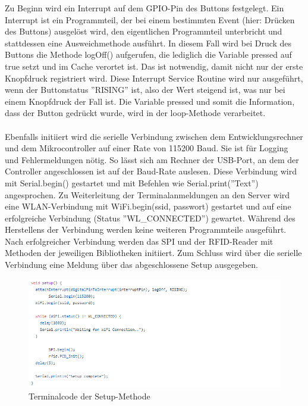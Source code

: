 \documentclass[12pt,titlepage]{scrartcl}
\begin{document}
		\noindent Zu Beginn wird ein Interrupt auf dem GPIO-Pin des Buttons festgelegt. Ein Interrupt ist ein Programmteil, der bei einem bestimmten Event (hier: Drücken des Buttons) ausgelöst wird, den eigentlichen Programmteil unterbricht und stattdessen eine Ausweichmethode ausführt. In diesem Fall wird bei Druck des Buttons die Methode logOff() aufgerufen, die lediglich die Variable pressed auf true setzt und im Cache verortet ist. Das ist notwendig, damit nicht nur der erste Knopfdruck registriert wird. Diese Interrupt Service Routine wird nur ausgeführt, wenn der Buttonstatus ''RISING'' ist, also der Wert steigend ist, was nur bei einem Knopfdruck der Fall ist. Die Variable pressed und somit die Information, dass der Button gedrückt wurde, wird in der loop-Methode verarbeitet. \\ \\
		Ebenfalls initiiert wird die serielle Verbindung zwischen dem Entwicklungsrechner und dem Mikrocontroller auf einer Rate von 115200 Baud. Sie ist für Logging und Fehlermeldungen nötig. So lässt sich am Rechner der USB-Port, an dem der Controller angeschlossen ist auf der Baud-Rate auslesen. Diese Verbindung wird mit Serial.begin() gestartet und mit Befehlen wie Serial.print(''Text'') angesprochen. Zu Weiterleitung der Terminalanmeldungen an den Server wird eine WLAN-Verbindung mit WiFi.begin(ssid, passwort) gestartet und auf eine erfolgreiche Verbindung (Status ''WL\_CONNECTED'') gewartet. Während des Herstellens der Verbindung werden keine weiteren Programmteile ausgeführt. Nach erfolgreicher Verbindung werden das SPI und der RFID-Reader mit Methoden der jeweiligen Bibliotheken initiiert. Zum Schluss wird über die serielle Verbindung eine Meldung über das abgeschlossene Setup ausgegeben. \\
			\begin{figure}[H] 
  			\centering
    		\includegraphics[height=0.3\textheight]{terminalSetup}
  			\caption{Terminalcode der Setup-Methode}
  			\label{fig:terminalSetup}
		\end{figure}
\end{document}
